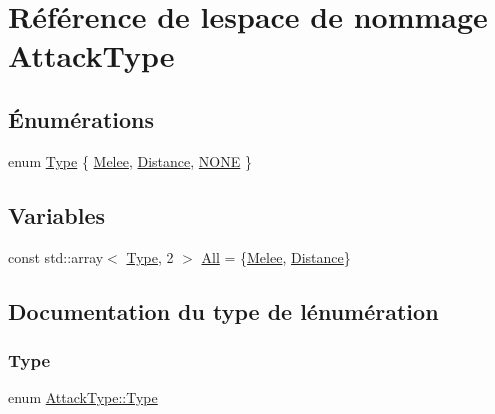 \hypertarget{namespaceAttackType}{}\section{Référence de l\textquotesingle{}espace de nommage Attack\+Type}
\label{namespaceAttackType}
\subsection*{Énumérations}
\begin{DoxyCompactItemize}
\item 
enum \hyperlink{namespaceAttackType_a26a2d73c5f73a06a63a568dcd519d302}{Type} \{ \hyperlink{namespaceAttackType_a26a2d73c5f73a06a63a568dcd519d302a53add169c04afbf920774a3cdf710106}{Melee}, 
\hyperlink{namespaceAttackType_a26a2d73c5f73a06a63a568dcd519d302a3a9ed6c6d45ca13d8df01c12f7d538fd}{Distance}, 
\hyperlink{namespaceAttackType_a26a2d73c5f73a06a63a568dcd519d302a73b8be32d0bc40ff4a231436e331f161}{N\+O\+NE}
 \}
\end{DoxyCompactItemize}
\subsection*{Variables}
\begin{DoxyCompactItemize}
\item 
const std\+::array$<$ \hyperlink{namespaceAttackType_a26a2d73c5f73a06a63a568dcd519d302}{Type}, 2 $>$ \hyperlink{namespaceAttackType_a44c88a70d0a57861180381c34bda18e9}{All} = \{\hyperlink{namespaceAttackType_a26a2d73c5f73a06a63a568dcd519d302a53add169c04afbf920774a3cdf710106}{Melee}, \hyperlink{namespaceAttackType_a26a2d73c5f73a06a63a568dcd519d302a3a9ed6c6d45ca13d8df01c12f7d538fd}{Distance}\}
\end{DoxyCompactItemize}


\subsection{Documentation du type de l\textquotesingle{}énumération}
\mbox{\label{namespaceAttackType_a26a2d73c5f73a06a63a568dcd519d302}} 
\subsubsection{\texorpdfstring{Type}{Type}}
{\footnotesize\ttfamily enum \hyperlink{namespaceAttackType_a26a2d73c5f73a06a63a568dcd519d302}{Attack\+Type\+::\+Type}}

